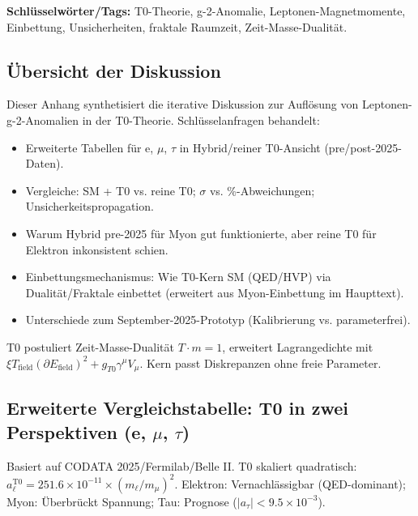 \documentclass[12pt,a4paper]{article}
\begin{document}
	\textbf{Schlüsselwörter/Tags:} T0-Theorie, g-2-Anomalie, Leptonen-Magnetmomente, Einbettung, Unsicherheiten, fraktale Raumzeit, Zeit-Masse-Dualität.
	
	\subsection{Übersicht der Diskussion}
	
	Dieser Anhang synthetisiert die iterative Diskussion zur Auflösung von Leptonen-g-2-Anomalien in der T0-Theorie. Schlüsselanfragen behandelt:
	\begin{itemize}
		\item Erweiterte Tabellen für e, $\mu$, $\tau$ in Hybrid/reiner T0-Ansicht (pre/post-2025-Daten).
		\item Vergleiche: SM + T0 vs. reine T0; $\sigma$ vs. \%-Abweichungen; Unsicherkeitspropagation.
		\item Warum Hybrid pre-2025 für Myon gut funktionierte, aber reine T0 für Elektron inkonsistent schien.
		\item Einbettungsmechanismus: Wie T0-Kern SM (QED/HVP) via Dualität/Fraktale einbettet (erweitert aus Myon-Einbettung im Haupttext).
		\item Unterschiede zum September-2025-Prototyp (Kalibrierung vs. parameterfrei).
	\end{itemize}
	
	T0 postuliert Zeit-Masse-Dualität $T \cdot m = 1$, erweitert Lagrangedichte mit $\xi T_\text{field} (\partial E_\text{field})^2 + g_{T0} \gamma^\mu V_\mu$. Kern passt Diskrepanzen ohne freie Parameter.
	
	\subsection{Erweiterte Vergleichstabelle: T0 in zwei Perspektiven (e, $\mu$, $\tau$)}
	
	Basiert auf CODATA 2025/Fermilab/Belle II. T0 skaliert quadratisch: $a_\ell^\text{T0} = 251.6 \times 10^{-11} \times (m_\ell / m_\mu)^2$. Elektron: Vernachlässigbar (QED-dominant); Myon: Überbrückt Spannung; Tau: Prognose ($|a_\tau| < 9.5 \times 10^{-3}$).
	
\end{document}
